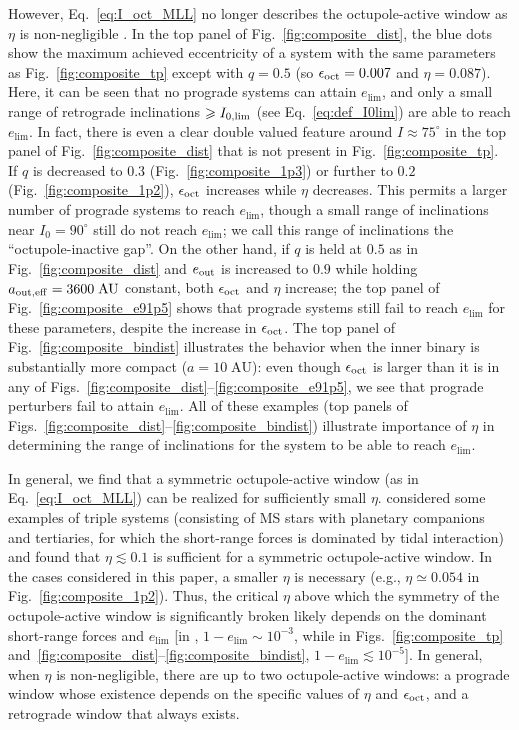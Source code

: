 \documentclass[
        fleqn,
        usenatbib,
    ]{mnras}
\begin{document}
However, Eq.~\eqref{eq:I_oct_MLL} no longer describes the octupole-active window
as $\eta$ is non-negligible \citep[see also][]{rodet_inprep}. In the top panel
of Fig.~\ref{fig:composite_dist}, the blue dots show the maximum achieved
eccentricity of a system with the same parameters as Fig.~\ref{fig:composite_tp}
except with $q = 0.5$ (so $\epsilon_{\rm oct} = 0.007$ and $\eta = 0.087$).
Here, it can be seen that no prograde systems can attain $e_{\lim}$, and only a
small range of retrograde inclinations $\geq I_{\rm 0, \lim}$ (see
Eq.~\ref{eq:def_I0lim}) are able to reach $e_{\lim}$. In fact, there is even a
clear double valued feature around $I \approx 75^\circ$ in the top panel of
Fig.~\ref{fig:composite_dist} that is not present in
Fig.~\ref{fig:composite_tp}. If $q$ is decreased to $0.3$
(Fig.~\ref{fig:composite_1p3}) or further to $0.2$
(Fig.~\ref{fig:composite_1p2}), $\epsilon_{\rm oct}$ increases while $\eta$
decreases. This permits a larger number of prograde systems to reach $e_{\lim}$,
though a small range of inclinations near $I_0 = 90^\circ$ still do not reach
$e_{\lim}$; we call this range of inclinations the ``octupole-inactive gap''. On
the other hand, if $q$ is held at $0.5$ as in Fig.~\ref{fig:composite_dist} and
$e_{\rm out}$ is increased to $0.9$ while holding $a_{\rm out, eff} =
3600\;\mathrm{AU}$ constant, both $\epsilon_{\rm oct}$ and $\eta$ increase; the
top panel of Fig.~\ref{fig:composite_e91p5} shows that prograde systems still
fail to reach $e_{\lim}$ for these parameters, despite the increase in
$\epsilon_{\rm oct}$. The top panel of Fig.~\ref{fig:composite_bindist}
illustrates the behavior when the inner binary is substantially more compact ($a
= 10\;\mathrm{AU}$): even though $\epsilon_{\rm oct}$ is larger than it is
in any of Figs.~\ref{fig:composite_dist}--\ref{fig:composite_e91p5}, we
see that prograde perturbers fail to attain $e_{\lim}$. All of these examples
(top panels of Figs.~\ref{fig:composite_dist}--\ref{fig:composite_bindist})
illustrate importance of $\eta$ in determining the range of inclinations for the
system to be able to reach $e_{\lim}$.

In general, we find that a symmetric octupole-active window (as in
Eq.~\ref{eq:I_oct_MLL}) can be realized for sufficiently small $\eta$.
\citet{rodet_inprep} considered some examples of triple systems (consisting of
MS stars with planetary companions and tertiaries, for which the short-range
forces is dominated by tidal interaction) and found that $\eta\lesssim 0.1$ is
sufficient for a symmetric octupole-active window. In the cases considered in
this paper, a smaller $\eta$ is necessary (e.g., $\eta\simeq 0.054$ in
Fig.~\ref{fig:composite_1p2}). Thus, the critical $\eta$ above which the
symmetry of the octupole-active window is significantly broken likely depends on
the dominant short-range forces and $e_{\lim}$ [in \citet{rodet_inprep}, $1 -
e_{\lim} \sim 10^{-3}$, while in Figs.~\ref{fig:composite_tp}
and~\ref{fig:composite_dist}--\ref{fig:composite_bindist}, $1 - e_{\lim}
\lesssim 10^{-5}$]. In general, when $\eta$ is non-negligible, there are up to
two octupole-active windows: a prograde window whose existence depends on the
specific values of $\eta$ and $\epsilon_{\rm oct}$, and a retrograde window that
always exists.
\end{document}
